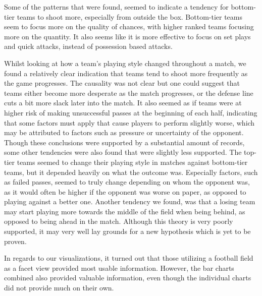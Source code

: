 \documentclass[Report.tex]{subfiles}
\begin{document}
 
Some of the patterns that were found, seemed to indicate a tendency for bottom-tier teams to shoot more, especially from outside the box. Bottom-tier teams seem to focus more on the quality of chances, with higher ranked teams focusing more on the quantity. It also seems like it is more effective to focus on set plays and quick attacks, instead of possession based attacks.

Whilst looking at how a team's playing style changed throughout a match, we found a relatively clear indication that teams tend to shoot more frequently as the game progresses. The causality was not clear but one could suggest that teams either become more desperate as the match progresses, or the defense line cuts a bit more slack later into the match. It also seemed as if teams were at higher risk of making unsuccessful passes at the beginning of each half, indicating that some factors must apply that cause players to perform slightly worse, which may be attributed to factors such as pressure or uncertainty of the opponent. Though these conclusions were supported by a substantial amount of records, some other tendencies were also found that were slightly less supported. The top-tier teams seemed to change their playing style in matches against bottom-tier teams, but it depended heavily on what the outcome was. Especially factors, such as failed passes, seemed to truly change depending on whom the opponent was, as it would often be higher if the opponent was worse on paper, as opposed to playing against a better one. Another tendency we found, was that a losing team may start playing more towards the middle of the field when being behind, as opposed to being ahead in the match. Although this theory is very poorly supported, it may very well lay grounds for a new hypothesis which is yet to be proven.

In regards to our visualizations, it turned out that those utilizing a football field as a facet view provided most usable information. However, the bar charts combined also provided valuable information, even though the individual charts did not provide much on their own.
\end{document}
